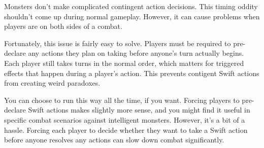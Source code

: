     Monsters don't make complicated contingent action decisions.
    This timing oddity shouldn't come up during normal gameplay.
    However, it can cause problems when players are on both sides of a combat.

    Fortunately, this issue is fairly easy to solve.
    Players must be required to pre-declare any  actions they plan on taking before anyone's turn actually begins.
    Each player still takes turns in the normal order, which matters for triggered effects that happen during a player's action.
    This prevents contigent Swift actions from creating weird paradoxes.

    You can choose to run this way all the time, if you want.
    Forcing players to pre-declare Swift actions makes slightly more sense, and you might find it useful in specific combat scenarios against intelligent monsters.
    However, it's a bit of a hassle.
    Forcing each player to decide whether they want to take a Swift action before anyone resolves any actions can slow down combat significantly.
